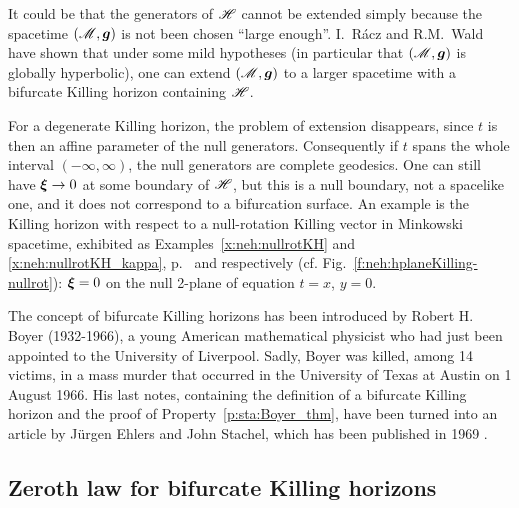 \begin{remark}
\label{r:sta:extension_bifurcate}
It could be that the generators of $\mathscr{H}$ cannot be extended simply
because the spacetime $(\mathscr{M},\bm{g})$ is not been chosen ``large enough''.
I.~R\'acz and R.M.~Wald \cite{RaczW96}
have shown that under some mild hypotheses (in particular that $(\mathscr{M},\bm{g})$ is globally
hyperbolic), one can extend $(\mathscr{M},\bm{g})$ to a larger spacetime with a bifurcate
Killing horizon containing $\mathscr{H}$.
\end{remark}

\begin{remark}
For a degenerate Killing horizon, the problem of extension disappears, since
$t$ is then an affine parameter of the null generators. Consequently if $t$ spans
the whole interval $(-\infty,\infty)$, the null generators are complete
geodesics. One can still have $\bm{\xi}\rightarrow 0$ at some boundary
of $\mathscr{H}$, but this is a null boundary, not a spacelike one, and it does not
correspond to a bifurcation surface. An example is the Killing horizon with
respect to a null-rotation Killing vector in Minkowski spacetime, exhibited
as Examples~\ref{x:neh:nullrotKH} and \ref{x:neh:nullrotKH_kappa},
p.~\pageref{x:neh:nullrotKH} and \pageref{x:neh:nullrotKH_kappa}
respectively (cf. Fig.~\ref{f:neh:hplaneKilling-nullrot}): $\bm{\xi}=0$
on the null 2-plane of equation $t=x$, $y=0$.
\end{remark}

\begin{hist} \label{h:sta:Boyer}
The concept of bifurcate Killing horizons has been introduced by Robert H. Boyer
(1932-1966), a young American mathematical physicist who had just been appointed
to the University of Liverpool. Sadly, Boyer was killed, among 14 victims, in a mass murder that
occurred in the University of Texas at Austin on 1 August 1966.
His last notes, containing the definition of a bifurcate Killing horizon
and the proof of Property~\ref{p:sta:Boyer_thm}, have been turned into an article
by Jürgen Ehlers and John Stachel, which has
been published in 1969 \cite{Boyer69}.
\end{hist}

\subsection{Zeroth law for bifurcate Killing horizons} \label{s:neh:zeroth_law_bifur}

